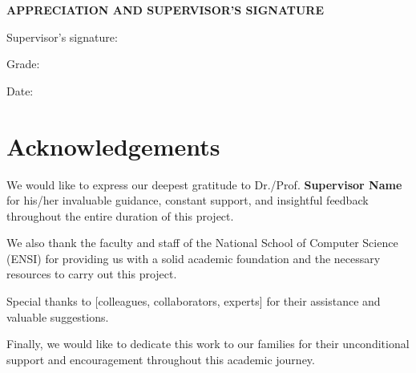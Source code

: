 \documentclass[12pt,a4paper,onecolumn,oneside]{report}
\begin{document}
\clearpage

\thispagestyle{empty}
\vspace*{5cm}
\begin{center}
    \textbf{\Large{APPRECIATION AND SUPERVISOR'S SIGNATURE}}
\end{center}
\vspace{3cm}

\noindent Supervisor's signature: \hrulefill

\noindent Grade: \hrulefill

\noindent Date: \hrulefill

\clearpage

\chapter*{Acknowledgements}

We would like to express our deepest gratitude to Dr./Prof. \textbf{Supervisor Name} for his/her invaluable guidance, constant support, and insightful feedback throughout the entire duration of this project.

We also thank the faculty and staff of the National School of Computer Science (ENSI) for providing us with a solid academic foundation and the necessary resources to carry out this project.

Special thanks to [colleagues, collaborators, experts] for their assistance and valuable suggestions.

Finally, we would like to dedicate this work to our families for their unconditional support and encouragement throughout this academic journey.

\clearpage

\begin{abstract}
    \noindent This project focuses on [brief description of the problem]. The main objective is to [state your main goal]. We propose a solution based on [your approach/methodology]. The system was implemented using [technologies/tools used]. 
    
    Key results show [quantitative findings and achievements]. The system demonstrates [performance metrics]. This work contributes to [significance/impact], offering a [value proposition].
    
    \textbf{Keywords:} keyword1, keyword2, keyword3, keyword4, keyword5
\end{abstract}
\end{document}
